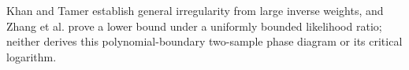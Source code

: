 Khan and Tamer establish general irregularity from large inverse weights, and Zhang et al. prove a lower bound under a uniformly bounded likelihood ratio; neither derives this polynomial-boundary two-sample phase diagram or its critical logarithm.
